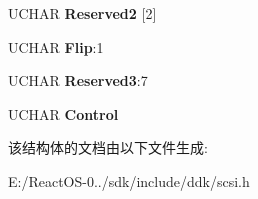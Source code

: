 \begin{DoxyCompactItemize}
U\+C\+H\+AR {\bfseries Reserved2} \mbox{[}2\mbox{]}
\item 
\mbox{\label{struct___c_d_b_1_1___p_o_s_i_t_i_o_n___t_o___e_l_e_m_e_n_t_a8b96123a97914056f89e7d2115e244fd}} 
U\+C\+H\+AR {\bfseries Flip}\+:1
\item 
\mbox{\label{struct___c_d_b_1_1___p_o_s_i_t_i_o_n___t_o___e_l_e_m_e_n_t_a8b96e96ab2f09a0e0f155b39942accf9}} 
U\+C\+H\+AR {\bfseries Reserved3}\+:7
\item 
\mbox{\label{struct___c_d_b_1_1___p_o_s_i_t_i_o_n___t_o___e_l_e_m_e_n_t_a7b1f650461f2a59f0e3801cf9b042efb}} 
U\+C\+H\+AR {\bfseries Control}
\end{DoxyCompactItemize}


该结构体的文档由以下文件生成\+:\begin{DoxyCompactItemize}
\item 
E\+:/\+React\+O\+S-\/0../sdk/include/ddk/scsi.\+h\end{DoxyCompactItemize}
